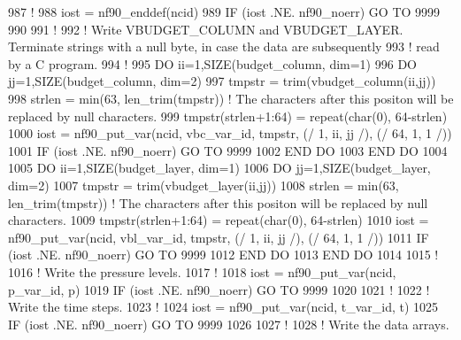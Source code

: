 \begin{DoxyCode}
987     \textcolor{comment}{!}
988     iost    = nf90\_enddef(ncid)
989     \textcolor{keywordflow}{IF} (iost .NE. nf90\_noerr) \textcolor{keywordflow}{GO TO} 9999
990 
991     \textcolor{comment}{!}
992     \textcolor{comment}{! Write VBUDGET\_COLUMN and VBUDGET\_LAYER. Terminate strings with a null byte, in case the data are
       subsequently }
993     \textcolor{comment}{! read by a C program.}
994     \textcolor{comment}{!}
995     \textcolor{keywordflow}{DO} ii=1,\textcolor{keyword}{SIZE}(budget\_column, dim=1)
996         \textcolor{keywordflow}{DO} jj=1,\textcolor{keyword}{SIZE}(budget\_column, dim=2)
997             tmpstr      = trim(vbudget\_column(ii,jj))
998             strlen      = min(63, len\_trim(tmpstr))         \textcolor{comment}{! The characters after this positon will be
       replaced by null characters.}
999             tmpstr(strlen+1:64)    = repeat(char(0), 64-strlen)
1000             iost        = nf90\_put\_var(ncid, vbc\_var\_id, tmpstr, (/ 1, ii, jj /), (/ 64, 1, 1 /))
1001             \textcolor{keywordflow}{IF} (iost .NE. nf90\_noerr) \textcolor{keywordflow}{GO TO} 9999
1002 \textcolor{keywordflow}{        END DO}
1003 \textcolor{keywordflow}{    END DO}
1004 
1005     \textcolor{keywordflow}{DO} ii=1,\textcolor{keyword}{SIZE}(budget\_layer, dim=1)
1006         \textcolor{keywordflow}{DO} jj=1,\textcolor{keyword}{SIZE}(budget\_layer, dim=2)
1007             tmpstr      = trim(vbudget\_layer(ii,jj))
1008             strlen      = min(63, len\_trim(tmpstr))         \textcolor{comment}{! The characters after this positon will be
       replaced by null characters.}
1009             tmpstr(strlen+1:64)    = repeat(char(0), 64-strlen)
1010             iost        = nf90\_put\_var(ncid, vbl\_var\_id, tmpstr, (/ 1, ii, jj /), (/ 64, 1, 1 /))
1011             \textcolor{keywordflow}{IF} (iost .NE. nf90\_noerr) \textcolor{keywordflow}{GO TO} 9999
1012 \textcolor{keywordflow}{        END DO}
1013 \textcolor{keywordflow}{    END DO}
1014 
1015     \textcolor{comment}{!}
1016     \textcolor{comment}{! Write the pressure levels.}
1017     \textcolor{comment}{!}
1018     iost    = nf90\_put\_var(ncid, p\_var\_id, p)
1019     \textcolor{keywordflow}{IF} (iost .NE. nf90\_noerr) \textcolor{keywordflow}{GO TO} 9999
1020 
1021     \textcolor{comment}{!}
1022     \textcolor{comment}{! Write the time steps.}
1023     \textcolor{comment}{!}
1024     iost    = nf90\_put\_var(ncid, t\_var\_id, t)
1025     \textcolor{keywordflow}{IF} (iost .NE. nf90\_noerr) \textcolor{keywordflow}{GO TO} 9999
1026 
1027     \textcolor{comment}{!}
1028     \textcolor{comment}{! Write the data arrays.}

\end{DoxyCode}
